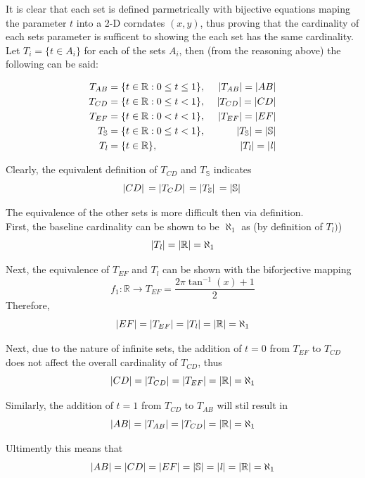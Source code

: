 \documentclass[]{article}
\newcommand{\R}{\mathbb{R}}
\begin{document}
It is clear that each set is defined parmetrically with bijective equations maping 
the parameter $t$ into a 2-D corndates $(x,y)$, thus proving that the cardinality 
of each sets parameter is sufficent to showing the each set has the same cardinality.\\

Let $T_i = \{t \in A_i\}$ for each of the sets $A_i$, then (from the reasoning above) 
the following can be said:

\begin{align*}
	T_{AB} &= \{t \in \R : 0 \leq t \leq 1\}, \ &\abs{T_{AB}} = \abs{AB}\\
	T_{CD} &= \{t \in \R : 0 \leq t < 1\}, \ &\abs{T_{CD}} = \abs{CD}\\
	T_{EF} &= \{t \in \R : 0 < t < 1\}, \ &\abs{T_{EF}} = \abs{EF}\\
	T_{\mathbb{S}} &= \{t \in \R : 0 \leq t < 1\}, \ &\abs{T_{\mathbb{S}}} = \abs{\mathbb{S}}\\
	T_{\mathit{l}} &= \{t \in \R\}, \ &\abs{T_{\mathit{l}}} = \abs{\mathit{l}}\\
\end{align*}

Clearly, the equivalent definition of $T_{CD}$ and $T_{\mathbb{S}}$ indicates
$$\abs*{CD} = \abs*{T_CD} = \abs*{T_\mathbb{S}} = \abs*{\mathbb{S}}$$

The equivalence of the other sets is more difficult then via definition.\\
First, the baseline cardinality can be shown to be $\aleph_1$ as (by definition of $T_{\mathit{l}})$)
$$\abs{T_\mathit{l}} = \abs{\R} = \aleph_1$$

Next, the equivalence of $T_{EF}$ and $T_\mathit{l}$ can be shown with the biforjective mapping 
$$f_1 : \R \rightarrow T_{EF} = \frac{2 \pi \tan^{-1}(x) + 1}{2}$$
Therefore,
$$\abs{EF} = \abs{T_{EF}} = \abs{T_{\mathit{l}}} = \abs{\R} = \aleph_1$$

Next, due to the nature of infinite sets, the addition of $t=0$ from $T_{EF}$ to $T_{CD}$ 
does not affect the overall cardinality of $T_{CD}$, thus
$$\abs{CD} = \abs{T_{CD}} = \abs{T_{EF}} = \abs{\R} = \aleph_1$$

Similarly, the addition of $t=1$ from $T_{CD}$ to $T_{AB}$ will stil result in 
$$\abs{AB} = \abs{T_{AB}} = \abs{T_{CD}} = \abs{\R} = \aleph_1$$

Ultimently this means that
$$\abs{AB} = \abs{CD} = \abs{EF} = \abs{\mathbb{S}} = \abs{\mathit{l}} = \abs{\R} = \aleph_1$$
\end{document}
